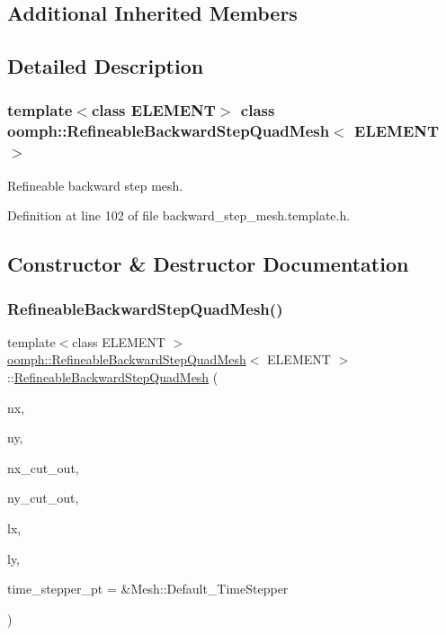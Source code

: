 \subsection*{Additional Inherited Members}


\subsection{Detailed Description}
\subsubsection*{template$<$class E\+L\+E\+M\+E\+NT$>$\newline
class oomph\+::\+Refineable\+Backward\+Step\+Quad\+Mesh$<$ E\+L\+E\+M\+E\+N\+T $>$}

Refineable backward step mesh. 

Definition at line 102 of file backward\+\_\+step\+\_\+mesh.\+template.\+h.



\subsection{Constructor \& Destructor Documentation}
\mbox{\label{classoomph_1_1RefineableBackwardStepQuadMesh_a0502cd96a9edc2789f9ddf6ec7b1d2ca}} 
\subsubsection{\texorpdfstring{Refineable\+Backward\+Step\+Quad\+Mesh()}{RefineableBackwardStepQuadMesh()}}
{\footnotesize\ttfamily template$<$class E\+L\+E\+M\+E\+NT $>$ \\
\hyperlink{classoomph_1_1RefineableBackwardStepQuadMesh}{oomph\+::\+Refineable\+Backward\+Step\+Quad\+Mesh}$<$ E\+L\+E\+M\+E\+NT $>$\+::\hyperlink{classoomph_1_1RefineableBackwardStepQuadMesh}{Refineable\+Backward\+Step\+Quad\+Mesh} (\begin{DoxyParamCaption}\item[{const unsigned \&}]{nx,  }\item[{const unsigned \&}]{ny,  }\item[{const unsigned \&}]{nx\+\_\+cut\+\_\+out,  }\item[{const unsigned \&}]{ny\+\_\+cut\+\_\+out,  }\item[{const double \&}]{lx,  }\item[{const double \&}]{ly,  }\item[{Time\+Stepper $\ast$}]{time\+\_\+stepper\+\_\+pt = {\ttfamily \&Mesh\+:\+:Default\+\_\+TimeStepper} }\end{DoxyParamCaption})\hspace{0.3cm}{\ttfamily [inline]}}



